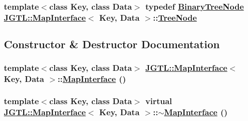 \hypertarget{class_j_g_t_l_1_1_map_interface_0e980afab09f7663362337e025f73540}{
\subsubsection[TreeNode]{\setlength{\rightskip}{0pt plus 5cm}template$<$class Key, class Data$>$ typedef \hyperlink{class_j_g_t_l_1_1_binary_tree_node}{Binary\-Tree\-Node} \hyperlink{class_j_g_t_l_1_1_map_interface}{JGTL::Map\-Interface}$<$ Key, Data $>$::\hyperlink{class_j_g_t_l_1_1_binary_tree_node}{Tree\-Node}}}
\label{class_j_g_t_l_1_1_map_interface_0e980afab09f7663362337e025f73540}




\subsection{Constructor \& Destructor Documentation}
\hypertarget{class_j_g_t_l_1_1_map_interface_6d49e996123c82dbc4ac2b526de5225d}{
\subsubsection[MapInterface]{\setlength{\rightskip}{0pt plus 5cm}template$<$class Key, class Data$>$ \hyperlink{class_j_g_t_l_1_1_map_interface}{JGTL::Map\-Interface}$<$ Key, Data $>$::\hyperlink{class_j_g_t_l_1_1_map_interface}{Map\-Interface} ()}}
\label{class_j_g_t_l_1_1_map_interface_6d49e996123c82dbc4ac2b526de5225d}


\hypertarget{class_j_g_t_l_1_1_map_interface_f6fd6f5a7643f34cae4b7b67ba98a832}{
\subsubsection[$\sim$MapInterface]{\setlength{\rightskip}{0pt plus 5cm}template$<$class Key, class Data$>$ virtual \hyperlink{class_j_g_t_l_1_1_map_interface}{JGTL::Map\-Interface}$<$ Key, Data $>$::$\sim$\hyperlink{class_j_g_t_l_1_1_map_interface}{Map\-Interface} ()}}
\label{class_j_g_t_l_1_1_map_interface_f6fd6f5a7643f34cae4b7b67ba98a832}


